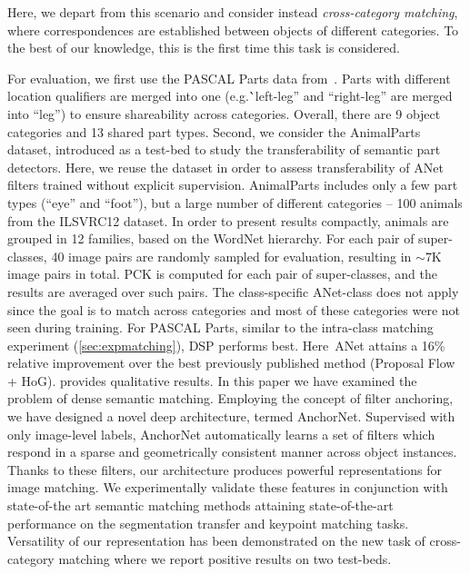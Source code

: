 \documentclass[10pt,twocolumn,letterpaper]{article}
\def\methodname{ANet\xspace}
\begin{document}
Here, we depart from this scenario and consider instead \textit{cross-category matching},  where correspondences are established between objects of different categories. To the best of our knowledge, this is the first time this task is considered. 

For evaluation, we first use the PASCAL Parts \cite{chen2014detect} data from~\cite{zhou15flowweb}. Parts with different location qualifiers are merged into one (e.g.\``left-leg'' and ``right-leg'' are merged into ``leg'') to ensure shareability across categories. Overall, there are 9 object categories and 13 shared part types. 
Second, we consider the AnimalParts~\cite{novotny16i-have} dataset, introduced as a test-bed to study the transferability of semantic part detectors. %
Here, we reuse the dataset in order to assess transferability of \methodname filters trained without explicit supervision. 
AnimalParts includes only a few part types (``eye'' and ``foot''), but a large number of different categories -- 100 animals from the ILSVRC12 dataset. In order to present results compactly, animals are grouped in 12 families, based on the WordNet \cite{Miller1995} hierarchy. For each pair of super-classes, 40 image pairs are randomly sampled for evaluation, resulting in $\sim$7K image pairs in total. PCK is computed for each pair of super-classes, and the results are averaged over such pairs. The class-specific \methodname-class does not apply since the goal is to match across categories and most of these categories were not seen during training.
For PASCAL Parts, similar to the intra-class matching experiment (\cref{sec:expmatching}), DSP performs best. Here~\methodname attains a 16\% relative improvement over the best previously published method (Proposal Flow + HoG). 
 provides qualitative results. %
In this paper we have examined the problem of dense semantic matching.
Employing the concept of filter anchoring, we have designed a novel deep architecture, termed AnchorNet.
Supervised with only image-level labels, AnchorNet automatically learns a set of filters which respond in a sparse and geometrically consistent manner across object instances. Thanks to these filters, our architecture produces powerful representations for image matching. We experimentally validate these features in conjunction with state-of-the art semantic matching methods attaining state-of-the-art
performance on the segmentation transfer and keypoint matching tasks.
Versatility of our representation has been demonstrated on the new task of cross-category matching where we report positive results on two test-beds.
\end{document}
